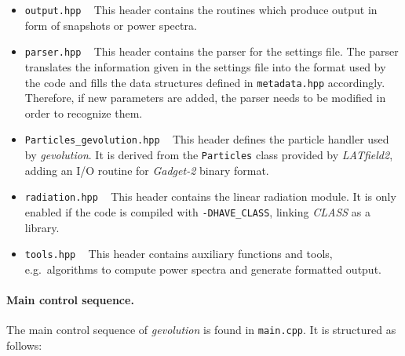 \documentclass[a4paper,10pt]{article}
\begin{document}
\begin{itemize}
 \item[] \hspace{-25pt}\texttt{output.hpp} ~ This header contains the routines which produce output in form of snapshots or power spectra.
 
 \item[] \hspace{-25pt}\texttt{parser.hpp} ~ This header contains the parser for the settings file. The parser translates the information
 given in the settings file into the format used by the code and fills the data structures defined in \texttt{metadata.hpp} accordingly.
 Therefore, if new parameters are added, the parser needs to be modified in order to recognize them.
 
 \item[] \hspace{-25pt}\texttt{Particles\_gevolution.hpp} ~ This header defines the particle handler used by \textit{gevolution}. It is
 derived from the \texttt{Particles} class provided by \textit{LATfield2}, adding an I/O routine for \textit{Gadget-2} binary format.
 
 \item[] \hspace{-25pt}\texttt{radiation.hpp} ~ This header contains the linear radiation module. It is only enabled if the code is
 compiled with \texttt{-DHAVE\_CLASS}, linking \textit{CLASS} as a library.
 
 \item[] \hspace{-25pt}\texttt{tools.hpp} ~ This header contains auxiliary functions and tools, e.g.\ algorithms to compute power spectra and generate formatted output.
\end{itemize}

\paragraph{Main control sequence.} The main control sequence of \textit{gevolution} is found in \texttt{main.cpp}. It is structured as follows:
\end{document}
